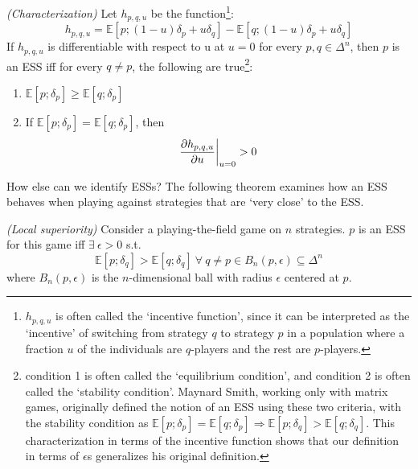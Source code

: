 \begin{theorem}{\emph{(Characterization)}}\label{characterization}
	Let $h_{p,q,u}$ be the function\footnote{$h_{p,q,u}$ is often called the `incentive function', since it can be interpreted as the `incentive' of switching from strategy $q$ to strategy $p$ in a population where a fraction $u$ of the individuals are $q$-players and the rest are $p$-players.}:
	\begin{equation*}
		h_{p,q,u} = \mathbb{E}[p;(1-u)\delta_p+u\delta_q] - \mathbb{E}[q;(1-u)\delta_p+u\delta_q]
	\end{equation*}
	If $h_{p,q,u}$ is differentiable with respect to u at $u=0$ for every $p,q \in \Delta^{n}$, then $p$ is an ESS iff for every $q \neq p$, the following are true\footnote{condition 1 is often called the `equilibrium condition', and condition 2 is often called the `stability condition'. Maynard Smith, working only with matrix games, originally defined the notion of an ESS using these two criteria, with the stability condition as $\mathbb{E}[p;\delta_p]=\mathbb{E}[q;\delta_p] \Rightarrow \mathbb{E}[p;\delta_q]>\mathbb{E}[q;\delta_q]$. This characterization in terms of the incentive function shows that our definition in terms of $\epsilon$s generalizes his original definition.}:
	\begin{enumerate}
		\item $\mathbb{E}[p;\delta_p] \geq \mathbb{E}[q;\delta_p]$
		\item If $\mathbb{E}[p;\delta_p] = \mathbb{E}[q;\delta_p]$, then
		\begin{equation*}
			\frac{\partial h_{p,q,u}}{\partial u}\bigg{|}_{u=0} > 0
		\end{equation*}
	\end{enumerate}
\end{theorem}
How else can we identify ESSs? The following theorem examines
how an ESS behaves when playing against strategies that are `very close' to the ESS.
\begin{theorem}\emph{(Local superiority)}
	\label{local_superiority}
	Consider a playing-the-field game on $n$ strategies. $p$ is an ESS for this game iff $\exists \ \epsilon > 0$ s.t. 
	\begin{equation*}
		\mathbb{E}[p;\delta_q] > \mathbb{E}[q;\delta_q] \ \forall \ q \neq p \in B_{n}(p,\epsilon) \subseteq \Delta^{n}
	\end{equation*}
	where $B_{n}(p,\epsilon)$ is the $n$-dimensional ball with radius $\epsilon$ centered at $p$.
\end{theorem}
